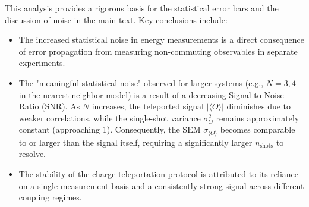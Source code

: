 This analysis provides a rigorous basis for the statistical error bars and the discussion of noise in the main text. Key conclusions include:
\begin{itemize}
    \item The increased statistical noise in energy measurements is a direct consequence of error propagation from measuring non-commuting observables in separate experiments.
    \item The "meaningful statistical noise" observed for larger systems (e.g., $N=3, 4$ in the nearest-neighbor model) is a result of a decreasing Signal-to-Noise Ratio (SNR). As $N$ increases, the teleported signal $|\langle O \rangle|$ diminishes due to weaker correlations, while the single-shot variance $\sigma_O^2$ remains approximately constant (approaching 1). Consequently, the SEM $\sigma_{\langle O \rangle}$ becomes comparable to or larger than the signal itself, requiring a significantly larger $n_{\text{shots}}$ to resolve.
    \item The stability of the charge teleportation protocol is attributed to its reliance on a single measurement basis and a consistently strong signal across different coupling regimes.
\end{itemize}
